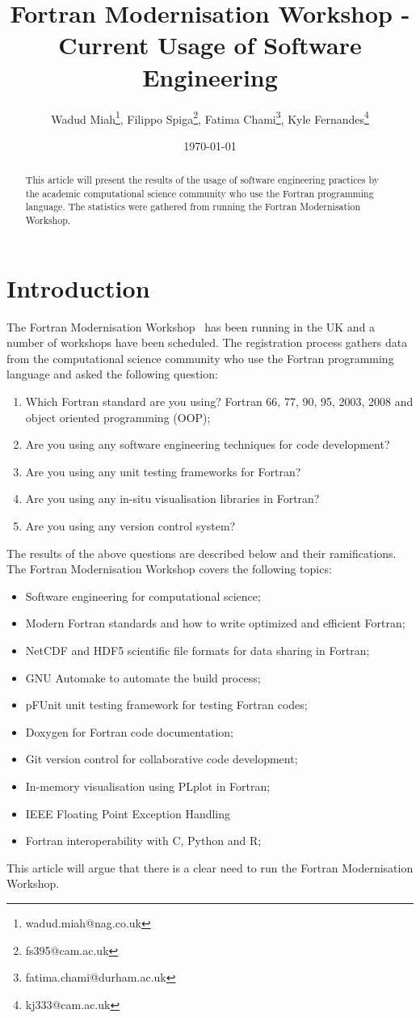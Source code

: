 \documentclass[12pt]{article}
\title{\bf Fortran Modernisation Workshop - \\ 
       Current Usage of Software Engineering}
\author{Wadud Miah\footnote{wadud.miah@nag.co.uk}, Filippo Spiga\footnote{fs395@cam.ac.uk}, Fatima Chami\footnote{fatima.chami@durham.ac.uk}, Kyle Fernandes\footnote{kj333@cam.ac.uk}}
\date{\today}
\begin{document}
\maketitle

\begin{abstract}
This article will present the results of the usage of software engineering
practices by the academic computational science community who use the Fortran
programming language. The statistics were gathered from running
the Fortran Modernisation Workshop. 
\end{abstract}
%
\section{Introduction}
The Fortran Modernisation Workshop~\cite{fmw:nag} has been running in the UK
and a number of workshops have been scheduled. The registration process gathers
data from the computational science community who use the Fortran programming
language and asked the following question:
\begin{enumerate}
\item Which Fortran standard are you using? Fortran 66, 77, 90, 95, 2003, 2008 and
object oriented programming (OOP);
\item Are you using any software engineering techniques for code development?
\item Are you using any unit testing frameworks for Fortran?
\item Are you using any in-situ visualisation libraries in Fortran?
\item Are you using any version control system?
\end{enumerate}
The results of the above questions are described below and their ramifications.
The Fortran Modernisation Workshop covers the following topics:
\begin{itemize}
\item Software engineering for computational science;
\item Modern Fortran standards and how to write optimized and efficient Fortran;
\item NetCDF and HDF5 scientific file formats for data sharing in Fortran;
\item GNU Automake to automate the build process;
\item pFUnit unit testing framework for testing Fortran codes;
\item Doxygen for Fortran code documentation;
\item Git version control for collaborative code development;
\item In-memory visualisation using PLplot in Fortran;
\item IEEE Floating Point Exception Handling
\item Fortran interoperability with C, Python and R;
\end{itemize}
This article will argue that there is a clear need to run the Fortran Modernisation 
Workshop. 
%
\end{document}
